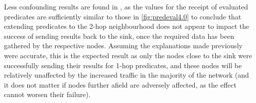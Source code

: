 Less confounding results are found in , as the values for the receipt of evaluated predicates are sufficiently similar to those in \autoref{fig:predeval4.0} to conclude that extending predicates to the 2-hop neighbourhood does not appear to impact the success of sending results back to the sink, once the required data has been gathered by the respective nodes. Assuming the explanations made previously were accurate, this is the expected result as only the nodes close to the sink were successfully sending their results for 1-hop predicates, and these nodes will be relatively unaffected by the increased traffic in the majority of the network (and it does not matter if nodes further afield are adversely affected, as the effect cannot worsen their failure).